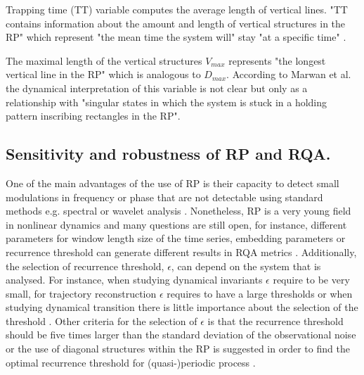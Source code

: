 Trapping time (TT) variable computes the average length of vertical lines. 
"TT contains information about the amount and length of vertical 
structures in the RP" which represent "the mean time the system will" 
stay "at a specific time" \citep[p. 17]{marwan2015}.

The maximal length of the vertical structures $V_{max}$ represents 
"the longest vertical line in the RP" which is analogous to $D_{max}$. 
According to Marwan et al. \cite[p. 17]{marwan2015} the dynamical 
interpretation of this variable is not clear but only as a relationship 
with "singular states in which the system is stuck in a holding pattern
inscribing rectangles in the RP".
%
 
 
\subsection{Sensitivity and robustness of RP and RQA.}
One of the main advantages of the use of RP is their capacity to detect 
small modulations in frequency or phase that are not detectable using standard 
methods e.g. spectral or wavelet analysis \citep{marwan2011}.
Nonetheless, RP is a very young field in nonlinear dynamics
and many questions are still open, for instance, 
different parameters for window length size of the time series,
embedding parameters or recurrence threshold can generate different 
results in RQA metrics \citep{marwan2011, eckmann1987}.
Additionally, the selection of recurrence threshold, $\epsilon$, 
can depend on the system that is analysed. For instance, when studying 
dynamical invariants $\epsilon$ require to be very small, for trajectory 
reconstruction $\epsilon$ requires to have a large thresholds or 
when studying dynamical transition there is little importance about the 
selection of the threshold \citep{marwan2011}. Other criteria for the 
selection of $\epsilon$ is that the recurrence threshold should be five 
times larger than the standard deviation of the observational noise
or the use of diagonal structures within the RP is suggested in order
to find the optimal recurrence threshold for (quasi-)periodic process 
\citep{marwan2011}.

